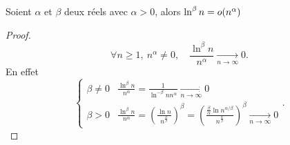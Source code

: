     \begin{prop}
      Soient \(\alpha\) et \(\beta\) deux réels avec \(\alpha>0\), alors 
      \(\ln^\beta n = o\mathopen{}\left(n^\alpha\right)\)
    \end{prop}
    \begin{proof}
      \begin{equation}
        \forall n \geqslant 1, \ n^\alpha \neq 0, \quad \frac{\ln^\beta 
        n}{n^\alpha} \underset{n\to \infty}{\longrightarrow} 0.
      \end{equation}
      En effet
      \begin{equation}
        \begin{cases}
          \beta \neq 0 & \frac{\ln^\beta n}{n^\alpha} = \frac{1}{\ln^{-\beta} n 
          n^\alpha} \underset{n\to \infty}{\longrightarrow} 0 \\
            \beta > 0 & \frac{\ln^\beta n}{n^\alpha} = \left(\frac{\ln 
            n}{n^{\frac{\alpha}{\beta}}}\right)^\beta = 
            \left(\frac{\frac{\beta}{\alpha}\ln 
            n^{\alpha/\beta}}{n^{\frac{\alpha}{\beta}}}\right)^\beta 
            \underset{n\to \infty}{\longrightarrow} 0
              \end{cases}.
            \end{equation}
          \end{proof}

